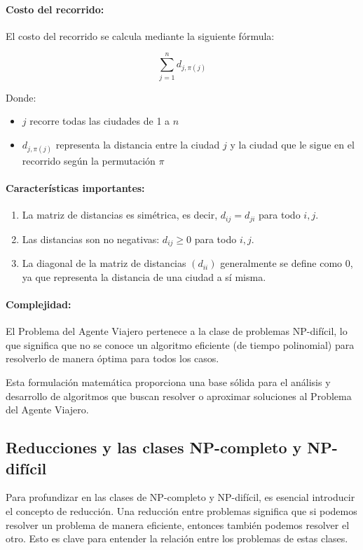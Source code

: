 \documentclass[12pt,titlepage,twoside,openright]{book}
\begin{document}
\paragraph{Costo del recorrido:}
El costo del recorrido se calcula mediante la siguiente fórmula:

\[
\sum_{j=1}^n d_{j,\pi(j)}
\]

Donde:
\begin{itemize}
    \item $j$ recorre todas las ciudades de 1 a $n$
    \item $d_{j,\pi(j)}$ representa la distancia entre la ciudad $j$ y la ciudad que le sigue en el recorrido según la permutación $\pi$
\end{itemize}

\paragraph{Características importantes:}
\begin{enumerate}
    \item La matriz de distancias es simétrica, es decir, $d_{ij} = d_{ji}$ para todo $i, j$.
    \item Las distancias son no negativas: $d_{ij} \geq 0$ para todo $i, j$.
    \item La diagonal de la matriz de distancias $(d_{ii})$ generalmente se define como 0, ya que representa la distancia de una ciudad a sí misma.
\end{enumerate}

\paragraph{Complejidad:}
El Problema del Agente Viajero pertenece a la clase de problemas NP-difícil, lo que significa que no se conoce un algoritmo eficiente (de tiempo polinomial) para resolverlo de manera óptima para todos los casos.

Esta formulación matemática proporciona una base sólida para el análisis y desarrollo de algoritmos que buscan resolver o aproximar soluciones al Problema del Agente Viajero.

\subsection{Reducciones y las clases NP-completo y NP-difícil}

Para profundizar en las clases de NP-completo y NP-difícil, es esencial introducir el concepto de reducción. Una reducción entre problemas significa que si podemos resolver un problema de manera eficiente, entonces también podemos resolver el otro. Esto es clave para entender la relación entre los problemas de estas clases.
\end{document}
